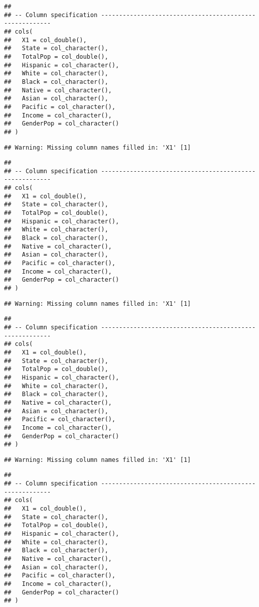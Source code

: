 \documentclass[
]{article}
\begin{document}
\begin{verbatim}
## 
## -- Column specification --------------------------------------------------------
## cols(
##   X1 = col_double(),
##   State = col_character(),
##   TotalPop = col_double(),
##   Hispanic = col_character(),
##   White = col_character(),
##   Black = col_character(),
##   Native = col_character(),
##   Asian = col_character(),
##   Pacific = col_character(),
##   Income = col_character(),
##   GenderPop = col_character()
## )
\end{verbatim}

\begin{verbatim}
## Warning: Missing column names filled in: 'X1' [1]
\end{verbatim}

\begin{verbatim}
## 
## -- Column specification --------------------------------------------------------
## cols(
##   X1 = col_double(),
##   State = col_character(),
##   TotalPop = col_double(),
##   Hispanic = col_character(),
##   White = col_character(),
##   Black = col_character(),
##   Native = col_character(),
##   Asian = col_character(),
##   Pacific = col_character(),
##   Income = col_character(),
##   GenderPop = col_character()
## )
\end{verbatim}

\begin{verbatim}
## Warning: Missing column names filled in: 'X1' [1]
\end{verbatim}

\begin{verbatim}
## 
## -- Column specification --------------------------------------------------------
## cols(
##   X1 = col_double(),
##   State = col_character(),
##   TotalPop = col_double(),
##   Hispanic = col_character(),
##   White = col_character(),
##   Black = col_character(),
##   Native = col_character(),
##   Asian = col_character(),
##   Pacific = col_character(),
##   Income = col_character(),
##   GenderPop = col_character()
## )
\end{verbatim}

\begin{verbatim}
## Warning: Missing column names filled in: 'X1' [1]
\end{verbatim}

\begin{verbatim}
## 
## -- Column specification --------------------------------------------------------
## cols(
##   X1 = col_double(),
##   State = col_character(),
##   TotalPop = col_double(),
##   Hispanic = col_character(),
##   White = col_character(),
##   Black = col_character(),
##   Native = col_character(),
##   Asian = col_character(),
##   Pacific = col_character(),
##   Income = col_character(),
##   GenderPop = col_character()
## )
\end{verbatim}
\end{document}
